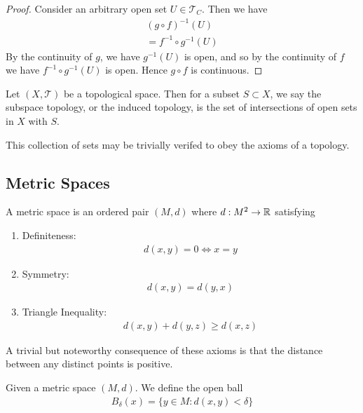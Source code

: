 \documentclass[]{article}
\begin{document}
\begin{proof}
		Consider an arbitrary open set $U \in \mathcal{T}_C$. Then we have
		\begin{align*}
				(g \circ f)^{-1}(U) \\
				= f^{-1} \circ g^{-1}(U)
		\end{align*}
		By the continuity of $g$, we have $g^{-1}(U)$ is open, and so by the continuity of $f$ we have $f^{-1} \circ g^{-1}(U)$ is open. Hence $g \circ f$ is continuous.
\end{proof}

\begin{defi} 
		Let $(X, \mathcal{T})$ be a topological space. Then for a subset $S \subset X$, we say the subspace topology, or the induced topology, is the set of intersections of open sets in $X$ with $S$.		
\end{defi}

This collection of sets may be trivially verifed to obey the axioms of a topology.

\subsection{Metric Spaces}

\begin{defi} 
		A metric space is an ordered pair $(M, d)$ where $d: M^2 \to \mathbb{R}$ satisfying
		\begin{enumerate}
				\item Definiteness:
						\begin{align*}
								d(x,y) = 0 \iff x = y
						\end{align*}
				\item Symmetry:
						\begin{align*}
								d(x,y) = d(y,x)
						\end{align*}
				\item Triangle Inequality:
						\begin{align*}
								d(x,y) + d(y,z) \geq d(x,z)	
						\end{align*}
		\end{enumerate}
\end{defi}

A trivial but noteworthy consequence of these axioms is that the distance between any distinct points is positive.

\begin{defi} 
		Given a metric space $(M, d)$. We define the open ball 
	\begin{align*}
			B_\delta(x) = \{y \in M : d(x,y) < \delta\}
	\end{align*}
\end{defi}
\end{document}
